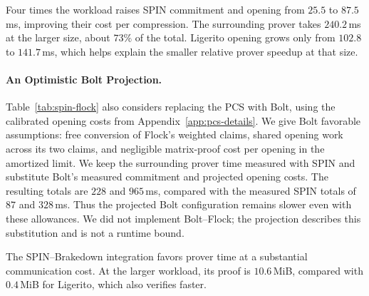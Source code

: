 Four times the workload raises SPIN commitment and opening from $25.5$
to $87.5$\,ms, improving their cost per compression. The surrounding
prover takes $240.2$\,ms at the larger size, about $73\%$ of the total.
Ligerito opening grows only from $102.8$ to $141.7$\,ms, which helps
explain the smaller relative prover speedup at that size.

\paragraph{An Optimistic Bolt Projection.}
Table~\ref{tab:spin-flock} also considers replacing the PCS with
Bolt, using the calibrated opening costs from Appendix~\ref{app:pcs-details}.
We give Bolt favorable assumptions: free conversion of Flock's weighted
claims, shared opening work across its two claims, and negligible
matrix-proof cost per opening in the amortized limit. We keep the
surrounding prover time measured with SPIN and substitute Bolt's measured
commitment and projected opening costs. The resulting totals are
$228$ and $965$\,ms, compared with the measured SPIN totals of $87$
and $328$\,ms. Thus the projected Bolt configuration remains slower even
with these allowances. We did not implement Bolt--Flock; the projection
describes this substitution and is not a runtime bound.

The SPIN--Brakedown integration favors prover time at a substantial
communication cost. At the larger workload, its proof is $10.6$\,MiB,
compared with $0.4$\,MiB for Ligerito, which also verifies faster.
